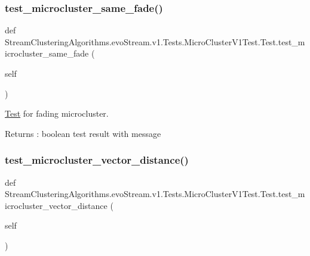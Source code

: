 \subsubsection{\texorpdfstring{test\+\_\+microcluster\+\_\+same\+\_\+fade()}{test\_microcluster\_same\_fade()}}
{\footnotesize\ttfamily def Stream\+Clustering\+Algorithms.\+evo\+Stream.\+v1.\+Tests.\+Micro\+Cluster\+V1\+Test.\+Test.\+test\+\_\+microcluster\+\_\+same\+\_\+fade (\begin{DoxyParamCaption}\item[{}]{self }\end{DoxyParamCaption})}



\hyperlink{classStreamClusteringAlgorithms_1_1evoStream_1_1v1_1_1Tests_1_1MicroClusterV1Test_1_1Test}{Test} for fading microcluster. 

\begin{DoxyReturn}{Returns}
\+: boolean test result with message 
\end{DoxyReturn}
\mbox{\label{classStreamClusteringAlgorithms_1_1evoStream_1_1v1_1_1Tests_1_1MicroClusterV1Test_1_1Test_a2adb5543257fd5ad77b753dd8710edaf}} 
\subsubsection{\texorpdfstring{test\+\_\+microcluster\+\_\+vector\+\_\+distance()}{test\_microcluster\_vector\_distance()}}
{\footnotesize\ttfamily def Stream\+Clustering\+Algorithms.\+evo\+Stream.\+v1.\+Tests.\+Micro\+Cluster\+V1\+Test.\+Test.\+test\+\_\+microcluster\+\_\+vector\+\_\+distance (\begin{DoxyParamCaption}\item[{}]{self }\end{DoxyParamCaption})}




